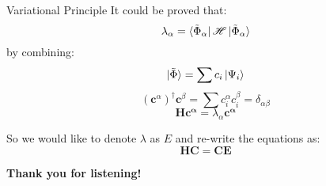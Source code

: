 \documentclass[aspectratio=169,10pt,compress,t]{ctexbeamer}
\begin{document}
\begin{frame}{Variational Principle}
It could be proved that:
$$\lambda_\alpha = \bra{\tilde{\Phi}_\alpha} \mathscr{H} \ket{\tilde{\Phi}_\alpha} $$
by combining:
$$\ket{\tilde{\Phi}} = \sum c_i \ket{\Psi_i} $$
$$(\mathbf{c}^\alpha)^\dagger \mathbf{c}^\beta = \sum c_i^\alpha c_i^\beta = \delta_{\alpha \beta}$$
$$\mathbf{H} \mathbf{c^\alpha} = \lambda_\alpha \mathbf{c^\alpha}$$

So we would like to denote $\lambda$ as $E$ and re-write the equations as:
$$\mathbf{HC}=\mathbf{CE}$$

\end{frame}

\begin{frame}[c,plain]
\begin{center}
\Huge\color{PPTBlue}\heiti\bfseries Thank you for listening!
\end{center}
\end{frame}
\end{document}
